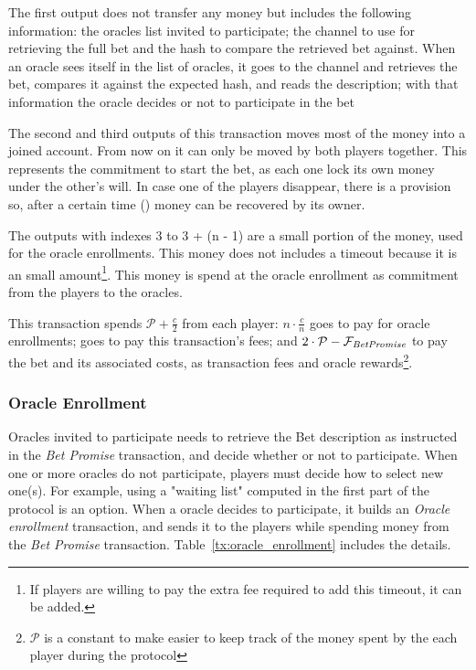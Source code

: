The first output does not transfer any money but includes the following
  information: the oracles list invited to participate; the channel to use for
  retrieving the full bet and the hash to compare the retrieved bet against.
When an oracle sees itself in the list of oracles, it goes to the channel and
  retrieves the bet, compares it against the expected hash, and reads the
  description; with that information the oracle decides or not to participate
  in the bet

The second and third outputs of this transaction moves most of the money into
  a joined account. From now on it can only be moved by both players
  together.
This represents the commitment to start the bet, as each one lock its own money
  under the other's will.
In case one of the players disappear, there is a provision so, after a certain
  time () money can be recovered by its owner.

The outputs with indexes 3 to 3 + (n - 1) are a small portion of the money, used
  for the oracle enrollments.
This money does not includes a timeout because it is an small amount\footnote{If
  players are willing to pay the extra fee required to add this timeout, it can
  be added.}.
This money is spend at the oracle enrollment as commitment from the players to
  the oracles.

This transaction spends $\mathcal{P} + \frac{c}{2}$ from each player:
  $ n \cdot \frac{c}{n}$ goes to pay for oracle enrollments; 
  goes to pay this transaction's fees; and
  $2 \cdot \mathcal{P} - \mathcal{F}_{\mathit{Bet Promise}}$ to pay the bet and its associated
  costs, as transaction fees and oracle rewards\footnote{$\mathcal{P}$ is a
  constant to make easier to keep track of the money spent by the each player
  during the protocol}.

\subsubsection{Oracle Enrollment}
Oracles invited to participate needs to retrieve the Bet description as
  instructed in the \textit{Bet Promise} transaction, and decide whether or not
  to participate.
When one or more oracles do not participate, players must decide how to select
  new one(s).
For example, using a "waiting list" computed in the first part of the protocol
  is an option.
When a oracle decides to participate, it builds an \textit{Oracle enrollment}
  transaction, and sends it to the players while spending money from the
  \textit{Bet Promise} transaction. Table~\ref{tx:oracle_enrollment} includes
  the details.


